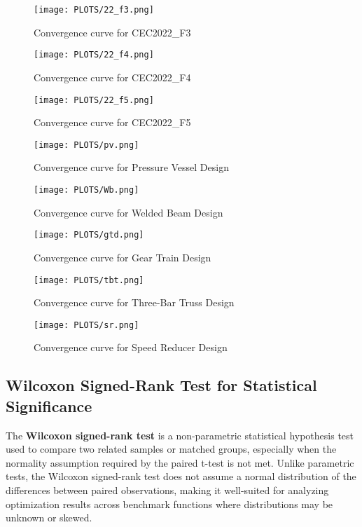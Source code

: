 \documentclass[12pt]{article}
\begin{document}
\begin{figure}[H]
    \centering
    \texttt{[image: PLOTS/22\_f3.png]}
    \caption{Convergence curve for CEC2022\_F3}
    \label{fig:convergence_2022_f3}
\end{figure}

\begin{figure}[H]
    \centering
    \texttt{[image: PLOTS/22\_f4.png]}
    \caption{Convergence curve for CEC2022\_F4}
    \label{fig:convergence_2022_f4}
\end{figure}

\begin{figure}[H]
    \centering
    \texttt{[image: PLOTS/22\_f5.png]}
    \caption{Convergence curve for CEC2022\_F5}
    \label{fig:convergence_2022_f5}
\end{figure}

\begin{figure}[H]
    \centering
    \texttt{[image: PLOTS/pv.png]}
    \caption{Convergence curve for Pressure Vessel Design}
    \label{fig:convergence_pressure_vessel}
\end{figure}

\begin{figure}[H]
    \centering
    \texttt{[image: PLOTS/Wb.png]}
    \caption{Convergence curve for Welded Beam Design}
    \label{fig:convergence_welded_beam}
\end{figure}

\begin{figure}[H]
    \centering
    \texttt{[image: PLOTS/gtd.png]}
    \caption{Convergence curve for Gear Train Design}
    \label{fig:convergence_gear_train}
\end{figure}

\begin{figure}[H]
    \centering
    \texttt{[image: PLOTS/tbt.png]}
    \caption{Convergence curve for Three-Bar Truss Design}
    \label{fig:convergence_three_bar_truss}
\end{figure}

\begin{figure}[H]
    \centering
    \texttt{[image: PLOTS/sr.png]}
    \caption{Convergence curve for Speed Reducer Design}
    \label{fig:convergence_speed_reducer}
\end{figure}

\subsection{Wilcoxon Signed-Rank Test for Statistical Significance}
The \textbf{Wilcoxon signed-rank test} is a non-parametric statistical hypothesis test used to compare two related samples or matched groups, especially when the normality assumption required by the paired t-test is not met. Unlike parametric tests, the Wilcoxon signed-rank test does not assume a normal distribution of the differences between paired observations, making it well-suited for analyzing optimization results across benchmark functions where distributions may be unknown or skewed.
\end{document}
